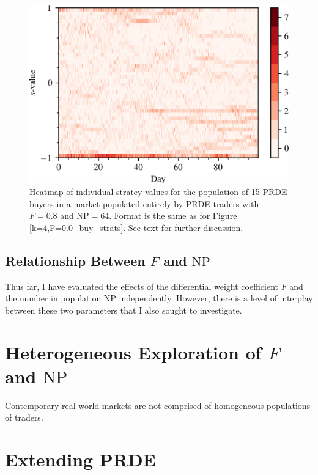 \documentclass[conference]{IEEEtran}
\begin{document}
\begin{figure}[htbp]
    \centerline{\includegraphics[width=\columnwidth]{k=4,F=0.8_buy_strats.png}}
    \caption{
        Heatmap of individual stratey values for the population of 15 PRDE buyers in a market populated entirely by PRDE traders with $F=0.8$ and $\mathrm{NP}=64$.
        Format is the same as for Figure \ref{k=4,F=0.0_buy_strats}.
        See text for further discussion.
    }
    \label{k=4,F=0.8_buy_strats}
\end{figure}

\subsection{Relationship Between $F$ and $\mathrm{NP}$}

Thus far, I have evaluated the effects of the differential weight coefficient $F$ and the number in population $\mathrm{NP}$ independently.
However, there is a level of interplay between these two parameters that I also sought to investigate.

\section{Heterogeneous Exploration of $F$ and $\mathrm{NP}$}

Contemporary real-world markets are not comprised of homogeneous populations of traders.

\section{Extending PRDE}



\end{document}
